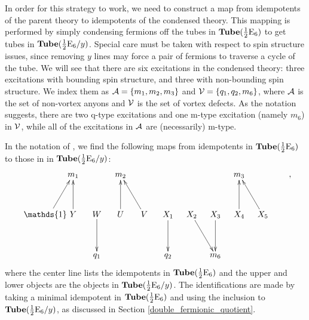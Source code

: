 In order for this strategy to work, we need to construct a map from idempotents of the parent theory to idempotents of the condensed theory.
This mapping is performed by simply condensing fermions off the tubes in $\textbf{Tube}(\frac{1}{2}\text{E}_6)$ to get tubes in $\textbf{Tube}(\frac{1}{2}\text{E}_6 / y)$. 
Special care must be taken with respect to spin structure issues, since removing $y$ lines may force a pair of fermions to traverse a cycle of the tube. 
We will see that there are six excitations in the condensed theory: three excitations 
with bounding spin structure, and three with non-bounding spin structure. 
We index them as $\mathcal{A} = \{ m_1, m_2, m_3\}$ and $\mathcal{V} = \{ q_1, q_2, m_6 \}$, 
where $\mathcal{A}$ is the set of non-vortex anyons and $\mathcal{V}$ is the set of vortex defects. 
As the notation suggests, there are two q-type excitations and one m-type excitation 
(namely $m_6$) in $\mathcal{V}$, while all of the excitations in $\mathcal{A}$ are (necessarily) m-type. 



In the notation of \cite{Hong2008}, we find the following maps from idempotents in $\textbf{Tube}(\frac{1}{2}\text{E}_6)$ to those in in $\textbf{Tube}(\frac{1}{2}\text{E}_6 / y)$:
\begin{align}
\xymatrix @!0 @M=1mm @C=10mm{
& &m_1 && m_2 && &&& m_3 &&  \\
 \\
 \quad&\mathds{1} \ar[ruu] \quad & Y \ar[uu] & W\ar[dd] & U\ar[uu] & V \ar[uul] & X_1 \ar[dd] & X_{2}\ar[ddr] &X_{3} \ar[dd] & X_4\ar[uu] & X_5\ar[uul] &  \\
\\
&&&q_1& &&q_2 &&m_6& &&  \\
},
\end{align}
where the center line lists the idempotents in $\textbf{Tube}(\frac{1}{2}\text{E}_6)$ and the upper and lower objects are the objects in $\textbf{Tube}(\frac{1}{2}\text{E}_6 / y)$.
The identifications are made by taking a minimal idempotent in $\textbf{Tube}(\frac{1}{2}\text{E}_6)$ and using the inclusion to $\textbf{Tube}(\frac{1}{2}\text{E}_6/y)$, 
as discussed in Section \ref{double_fermionic_quotient}.

